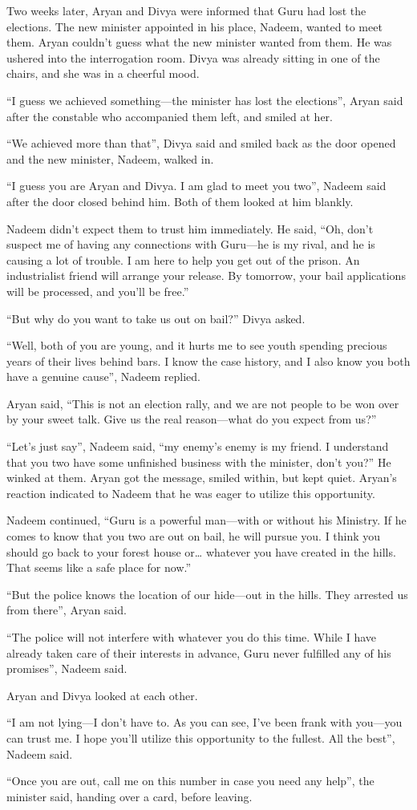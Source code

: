 Two weeks later, Aryan and Divya were informed that Guru had lost the elections.
The new minister appointed in his place, Nadeem, wanted to meet them. Aryan
couldn't guess what the new minister wanted from them. He was ushered into
the interrogation room. Divya was already sitting in one of the chairs, and she
was in a cheerful mood.

“I guess we achieved something—the minister has lost the elections”, Aryan
said after the constable who accompanied them left, and smiled at her.

“We achieved more than that”, Divya said and smiled back as the door opened and
the new minister, Nadeem, walked in.

“I guess you are Aryan and Divya. I am glad to meet you two”, Nadeem said after
the door closed behind him. Both of them looked at him blankly.

Nadeem didn't expect them to trust him immediately. He said, “Oh, don't suspect
me of having any connections with Guru—he is my rival, and he is causing a lot of
trouble. I am here to help you get out of the prison. An industrialist friend
will arrange your release. By tomorrow, your bail applications will be processed,
and you'll be free.”

“But why do you want to take us out on bail?” Divya asked.

“Well, both of you are young, and it hurts me to see youth spending precious
years of their lives behind bars. I know the case history, and I also know you
both have a genuine cause”, Nadeem replied.

Aryan said, “This is not an election rally, and we are not people to be won over
by your sweet talk. Give us the real reason—what do you expect from us?”

“Let's just say”, Nadeem said, “my enemy's enemy is my friend. I understand that
you two have some unfinished business with the minister, don't you?” He winked
at them. Aryan got the message, smiled within, but kept quiet. Aryan's reaction
indicated to Nadeem that he was eager to utilize this opportunity.

Nadeem continued, “Guru is a powerful man—with or without his Ministry. If he
comes to know that you two are out on bail, he will pursue you. I think you
should go back to your forest house or… whatever you have created in the
hills. That seems like a safe place for now.”

“But the police knows the location of our hide—out in the hills. They arrested
us from there”, Aryan said.

“The police will not interfere with whatever you do this time. While I have
already taken care of their interests in advance, Guru never fulfilled any of
his promises”, Nadeem said.

Aryan and Divya looked at each other.

“I am not lying—I don't have to. As you can see, I've been frank with you—you
can trust me. I hope you'll utilize this opportunity to the fullest. All the
best”, Nadeem said.

“Once you are out, call me on this number in case you need any help”, the
minister said, handing over a card, before leaving.